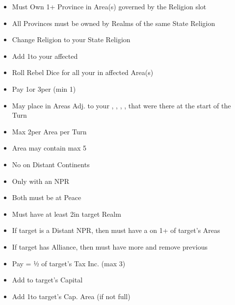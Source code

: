 \documentclass[10pt]{article}
\begin{document}
\begin{itemize}
	\item Must Own 1+ Province in Area(s) governed by the Religion slot
	\item All Provinces must be owned by Realms of the same State Religion
	\item Change Religion to your State Religion
	\item Add 1\unrest to your affected \towns
	\item Roll Rebel Dice for all your \unrest in affected Area(s)
\end{itemize}

\begin{itemize}
	\item Pay 1\diplopower or 3\ducats per \influence (min 1\diplopower)
	\item May place \influence in Areas Adj. to your \towns, \vassals, \alliances, \marriages, \influence that were there at the start of the Turn
	\item Max 2\influence per Area per Turn
	\item Area may contain max 5\influence
	\item No \influence on Distant Continents
\end{itemize}

\begin{itemize}
	\item Only with an NPR
	\item Both must be at Peace
	\item Must have at least 2\influence in target Realm
	\item If target is a Distant NPR, then must have a \claim on 1+ of target's Areas
	\item If target has Alliance, then must have more \influence and remove previous \alliance
	\item Pay \diplopower = ½ of target's Tax Inc. (max 3)
	\item Add \alliance to target's Capital
	\item Add 1\influence to target's Cap. Area (if not full)
\end{itemize}
\end{document}
